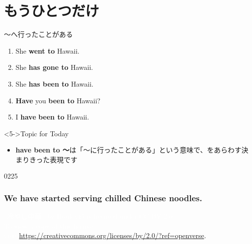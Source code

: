 \documentclass[aspectratio=169,xcolor={dvipsnames,table}]{beamer}
\newcommand{\myaudio}[1]{\href{#1}{\faVolumeUp}}
\begin{document}
\section{もうひとつだけ}
\begin{frame}[plain,t]{～へ行ったことがある}

\begin{enumerate}
 \item<1-> She \textbf{went to} Hawaii.
 \item<2-> She \textbf{has gone to} Hawaii.
 \item<3-> She \textbf{has been to} Hawaii.
 \item<4-> \textbf{Have} you  \textbf{been to} Hawaii?
 \item<5-> I \textbf{have}  \textbf{been to} Hawaii.
\end{enumerate}

\vfill

\begin{block}<5->{Topic for Today}\small
\begin{itemize}[square]\small
 \item \textbf{have been to ～}は「～に行ったことがある」という意味で、をあらわす決まりきった表現です
\end{itemize}
\end{block}

\vspace{-8pt}

\hfill{\scriptsize 0225}\,{\scriptsize \myaudio{./audio/014_have_pp_kekka_08.mp3}}

\end{frame}
{
  \begin{frame}[t]
    \frametitle{We have started serving chilled Chinese noodles.}
\tiny
\raggedright
  \textcolor{white}{ ``冷やし中華'' by Roulex45 is licensed under CC BY 2.0. }\\
   \textcolor{white}{To view a copy of this license,}\\
\textcolor{white}{visit \url{https://creativecommons.org/licenses/by/2.0/?ref=openverse}}.
  \end{frame}
}
\end{document}
